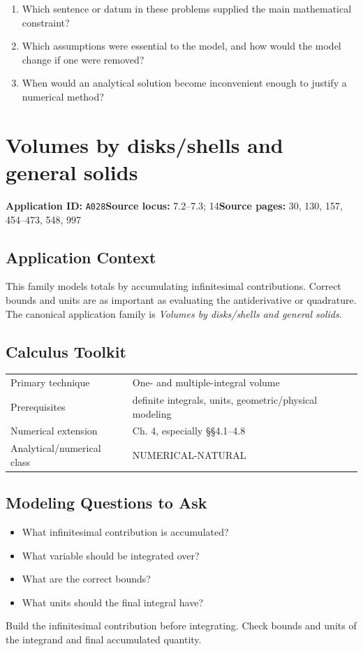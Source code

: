 \documentclass[11pt]{book}
\newcommand{\pid}[1]{\texttt{#1}}
\begin{document}
\begin{reflectionbox}\begin{enumerate}
\item Which sentence or datum in these problems supplied the main mathematical constraint?
\item Which assumptions were essential to the model, and how would the model change if one were removed?
\item When would an analytical solution become inconvenient enough to justify a numerical method?
\end{enumerate}\end{reflectionbox}
\chapter{Volumes by disks/shells and general solids}\label{app:A028}
\textbf{Application ID:} \pid{A028}\quad \textbf{Source locus:} 7.2–7.3; 14\quad \textbf{Source pages:} 30, 130, 157, 454–473, 548, 997
\section*{Application Context}
This family models totals by accumulating infinitesimal contributions. Correct bounds and units are as important as evaluating the antiderivative or quadrature. The canonical application family is \emph{Volumes by disks/shells and general solids}.
\section*{Calculus Toolkit}
\begin{tabularx}{\textwidth}{@{}lX@{}}\toprule
Primary technique & One- and multiple-integral volume \\
Prerequisites & definite integrals, units, geometric/physical modeling \\
Numerical extension & Ch. 4, especially §§4.1–4.8 \\
Analytical/numerical class & NUMERICAL-NATURAL \\
\bottomrule\end{tabularx}
\section*{Modeling Questions to Ask}\begin{itemize}
\item What infinitesimal contribution is accumulated?
\item What variable should be integrated over?
\item What are the correct bounds?
\item What units should the final integral have?
\end{itemize}
\begin{errorbox}Build the infinitesimal contribution before integrating. Check bounds and units of the integrand and final accumulated quantity.\end{errorbox}
\end{document}
